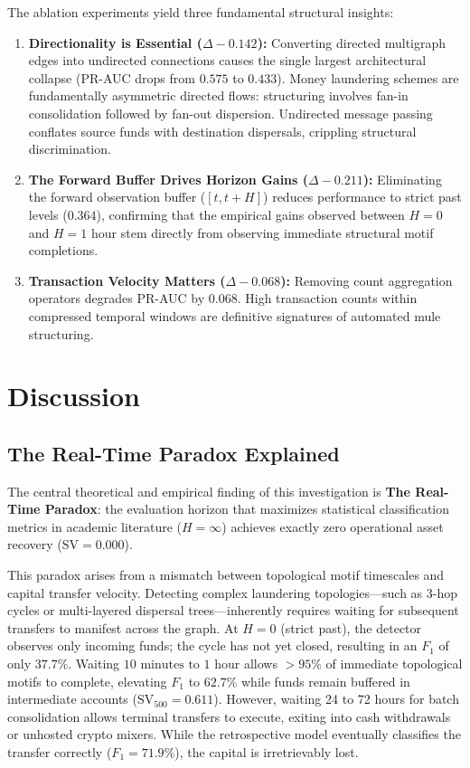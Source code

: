 \documentclass[pdflatex,sn-mathphys,Numbered]{sn-jnl}
\theoremstyle{thmstyleone}
\theoremstyle{thmstyletwo}
\theoremstyle{thmstylethree}
\begin{document}
The ablation experiments yield three fundamental structural insights:
\begin{enumerate}
    \item \textbf{Directionality is Essential ($\Delta -0.142$):} Converting directed multigraph edges into undirected connections causes the single largest architectural collapse (PR-AUC drops from $0.575$ to $0.433$). Money laundering schemes are fundamentally asymmetric directed flows: structuring involves fan-in consolidation followed by fan-out dispersion. Undirected message passing conflates source funds with destination dispersals, crippling structural discrimination.
    \item \textbf{The Forward Buffer Drives Horizon Gains ($\Delta -0.211$):} Eliminating the forward observation buffer ($[t, t+H]$) reduces performance to strict past levels ($0.364$), confirming that the empirical gains observed between $H=0$ and $H=1\text{ hour}$ stem directly from observing immediate structural motif completions.
    \item \textbf{Transaction Velocity Matters ($\Delta -0.068$):} Removing count aggregation operators degrades PR-AUC by $0.068$. High transaction counts within compressed temporal windows are definitive signatures of automated mule structuring.
\end{enumerate}

\section{Discussion}
\label{sec:discussion}

\subsection{The Real-Time Paradox Explained}
The central theoretical and empirical finding of this investigation is \textbf{The Real-Time Paradox}: the evaluation horizon that maximizes statistical classification metrics in academic literature ($H=\infty$) achieves exactly zero operational asset recovery ($\text{SV} = 0.000$). 

This paradox arises from a mismatch between topological motif timescales and capital transfer velocity. Detecting complex laundering topologies---such as 3-hop cycles or multi-layered dispersal trees---inherently requires waiting for subsequent transfers to manifest across the graph. At $H=0$ (strict past), the detector observes only incoming funds; the cycle has not yet closed, resulting in an $F_1$ of only $37.7\%$. Waiting $10\text{ minutes to } 1\text{ hour}$ allows $>95\%$ of immediate topological motifs to complete, elevating $F_1$ to $62.7\%$ while funds remain buffered in intermediate accounts ($\text{SV}_{500} = 0.611$). However, waiting 24 to 72 hours for batch consolidation allows terminal transfers to execute, exiting into cash withdrawals or unhosted crypto mixers. While the retrospective model eventually classifies the transfer correctly ($F_1 = 71.9\%$), the capital is irretrievably lost.
\end{document}
